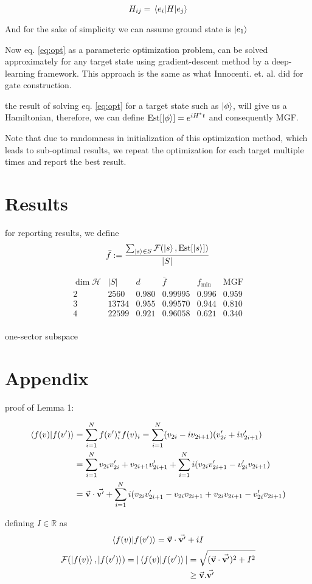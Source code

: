 \documentclass{article}
\DeclareMathOperator*{\est}{Est}
\begin{document}
\[ H_{ij} = \mel{e_i}{H}{e_j} \]

And for the sake of simplicity we can assume ground state is $\ket{e_1}$

Now eq. \ref{eq:opt} as a parameteric optimization problem, can be solved approximately for any target state using gradient-descent method by a deep-learning framework. This approach is the same as what Innocenti. et. al. did for gate construction.

the result of solving eq. \ref{eq:opt} for a target state such as $\ket{\phi}$, will give us a Hamiltonian, therefore, we can define $\est[\ket{\phi}] = e^{iH^*t}$ and consequently MGF.

Note that due to randomness in initialization of this optimization method, which leads to sub-optimal results, we repeat the optimization for each target multiple times and report the best result.

\section{Results}
for reporting results, we define
\[ \bar{f} := \frac{\sum_{\ket{s}\in S} \mathcal{F}(\ket{s}, \est[\ket{s}])}{|S|}  \]

\begin{table}[H]
\[ \begin{array}{c|c|c|c|c||c}
\dim \mathcal{H} & |S| & d & \bar{f} & f_{\min} & \text{MGF} \\
\hline 2 & 2560 & 0.980 & 0.99995 & 0.996 & 0.959 \\
3 & 13734 & 0.955 & 0.99570 & 0.944 & 0.810 \\
4 & 22599 & 0.921 & 0.96058 & 0.621 & 0.340 \\
\end{array} \]
\caption{one-sector subspace}
\end{table}
\section*{Appendix}
proof of Lemma 1:

\begin{align*} \braket{f(v)}{f(v')} &= \sum_{i=1}^N f(v')_i^* f(v)_i = \sum_{i=1}^N (v_{2i} - iv_{2i+1}) (v'_{2i} + iv'_{2i+1}) \\
& = \sum_{i=1}^N v_{2i}v'_{2i} + v_{2i+1}v'_{2i+1} +  \sum_{i=1}^N i(v_{2i}v'_{2i+1} - v'_{2i}v_{2i+1}) \\
& = \va{v}\cdot\va{v'} + \sum_{i=1}^N i(v_{2i}v'_{2i+1} - v_{2i}v_{2i+1} + v_{2i}v_{2i+1}- v'_{2i}v_{2i+1}) \end{align*}

defining $I \in \mathbb{R}$ as
\[ \braket{f(v)}{f(v')} = \va{v}\cdot\va{v'} + iI \]
\begin{align*} \mathcal{F}(\ket{f(v)}, \ket{f(v')}) = |\braket{f(v)}{f(v')}| &= \sqrt{(\va{v}\cdot\va{v'})^2 + I^2} \\
& \ge \va{v}.\va{v'}
\end{align*}
\end{document}
